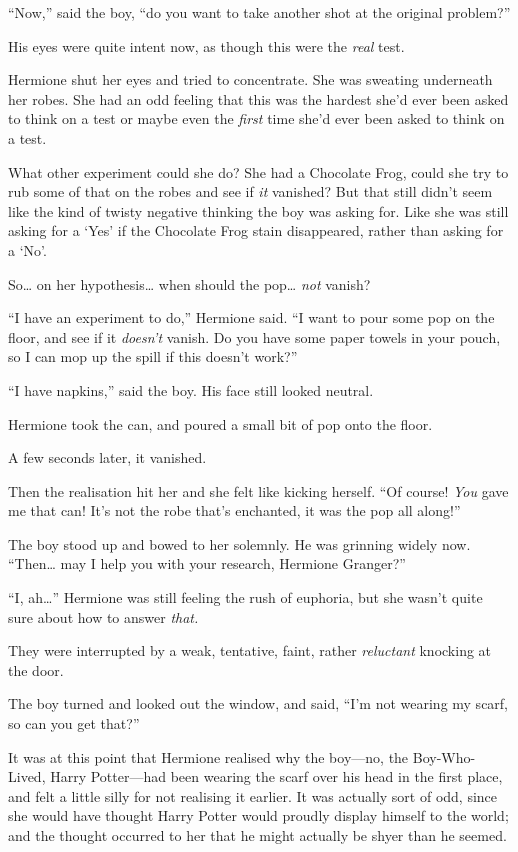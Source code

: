 ``Now,'' said the boy, ``do you want to take another shot at the
original problem?''

His eyes were quite intent now, as though this were the \emph{real}
test.

Hermione shut her eyes and tried to concentrate. She was sweating
underneath her robes. She had an odd feeling that this was the hardest
she'd ever been asked to think on a test or maybe even the \emph{first}
time she'd ever been asked to think on a test.

What other experiment could she do? She had a Chocolate Frog, could she
try to rub some of that on the robes and see if \emph{it} vanished? But
that still didn't seem like the kind of twisty negative thinking the boy
was asking for. Like she was still asking for a `Yes' if the Chocolate
Frog stain disappeared, rather than asking for a `No'.

So\ldots{} on her hypothesis\ldots{} when should the pop\ldots{}
\emph{not} vanish?

``I have an experiment to do,'' Hermione said. ``I want to pour some pop
on the floor, and see if it \emph{doesn't} vanish. Do you have some
paper towels in your pouch, so I can mop up the spill if this doesn't
work?''

``I have napkins,'' said the boy. His face still looked neutral.

Hermione took the can, and poured a small bit of pop onto the floor.

A few seconds later, it vanished.

Then the realisation hit her and she felt like kicking herself. ``Of
course! \emph{You} gave me that can! It's not the robe that's enchanted,
it was the pop all along!''

The boy stood up and bowed to her solemnly. He was grinning widely now.
``Then\ldots{} may I help you with your research, Hermione Granger?''

``I, ah\ldots{}'' Hermione was still feeling the rush of euphoria, but
she wasn't quite sure about how to answer \emph{that.}

They were interrupted by a weak, tentative, faint, rather
\emph{reluctant} knocking at the door.

The boy turned and looked out the window, and said, ``I'm not wearing my
scarf, so can you get that?''

It was at this point that Hermione realised why the boy---no, the
Boy-Who-Lived, Harry Potter---had been wearing the scarf over his head
in the first place, and felt a little silly for not realising it
earlier. It was actually sort of odd, since she would have thought Harry
Potter would proudly display himself to the world; and the thought
occurred to her that he might actually be shyer than he seemed.

